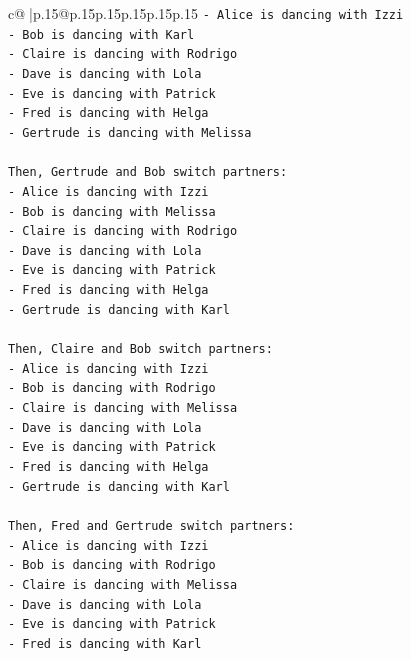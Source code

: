 \documentclass{article}
\begin{document}
{\begin{supertabular}{c@{$\;$}|p{.15\linewidth}@{}p{.15\linewidth}p{.15\linewidth}p{.15\linewidth}p{.15\linewidth}p{.15\linewidth}}
{{{\texttt{{-} Alice is dancing with Izzi} \\
\texttt{{-} Bob is dancing with Karl} \\
\texttt{{-} Claire is dancing with Rodrigo} \\
\texttt{{-} Dave is dancing with Lola} \\
\texttt{{-} Eve is dancing with Patrick} \\
\texttt{{-} Fred is dancing with Helga} \\
\texttt{{-} Gertrude is dancing with Melissa} \\
\\ 
\texttt{Then, Gertrude and Bob switch partners:} \\
\texttt{{-} Alice is dancing with Izzi} \\
\texttt{{-} Bob is dancing with Melissa} \\
\texttt{{-} Claire is dancing with Rodrigo} \\
\texttt{{-} Dave is dancing with Lola} \\
\texttt{{-} Eve is dancing with Patrick} \\
\texttt{{-} Fred is dancing with Helga} \\
\texttt{{-} Gertrude is dancing with Karl} \\
\\ 
\texttt{Then, Claire and Bob switch partners:} \\
\texttt{{-} Alice is dancing with Izzi} \\
\texttt{{-} Bob is dancing with Rodrigo} \\
\texttt{{-} Claire is dancing with Melissa} \\
\texttt{{-} Dave is dancing with Lola} \\
\texttt{{-} Eve is dancing with Patrick} \\
\texttt{{-} Fred is dancing with Helga} \\
\texttt{{-} Gertrude is dancing with Karl} \\
\\ 
\texttt{Then, Fred and Gertrude switch partners:} \\
\texttt{{-} Alice is dancing with Izzi} \\
\texttt{{-} Bob is dancing with Rodrigo} \\
\texttt{{-} Claire is dancing with Melissa} \\
\texttt{{-} Dave is dancing with Lola} \\
\texttt{{-} Eve is dancing with Patrick} \\
\texttt{{-} Fred is dancing with Karl} \\
}}}
\end{supertabular}}
\end{document}
